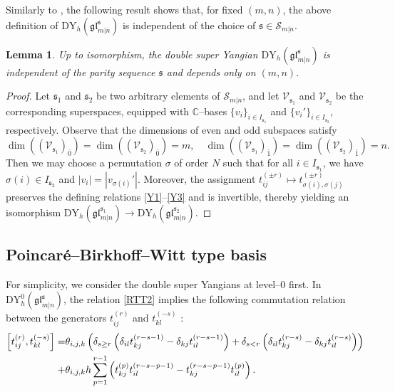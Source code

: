 \documentclass[a4paper,12pt]{article}
\newtheorem{lemm}[theo]{Lemma}
\numberwithin{equation}{section}
\begin{document}
Similarly to \cite[Lemma 2.24]{T20}, the following result shows that, for fixed $(m,n)$, the above definition of $\mathrm{DY}_{h}(\mathfrak{gl}_{m|n}^{\mathfrak{s}})$ is independent of the choice of $\mathfrak{s}\in\mathcal{S}_{m|n}$.

\begin{lemm}\label{DY-iso}
Up to isomorphism, the double super Yangian $\mathrm{DY}_{h}(\mathfrak{gl}_{m|n}^{\mathfrak{s}})$ is independent of the parity sequence $\mathfrak{s}$ and depends only on $(m,n)$.
\end{lemm}
\begin{proof}
Let $\mathfrak{s}_1$ and $\mathfrak{s}_2$ be two arbitrary elements of $\mathcal{S}_{m|n}$, and let $\mathcal{V}_{\mathfrak{s}_1}$ and $\mathcal{V}_{\mathfrak{s}_2}$ be the corresponding superspaces, equipped with $\mathbb{C}$--bases $\{v_{i}\}_{i\in I_{\mathfrak{s}_1}}$ and $\{v_{i}'\}_{i\in I_{\mathfrak{s}_2}}$, respectively. Observe that the dimensions of even and odd subspaces satisfy
$$
\dim((\mathcal{V}_{\mathfrak{s}_1})_{\bar{0}})=\dim((\mathcal{V}_{\mathfrak{s}_2})_{\bar{0}})=m,\quad \dim((\mathcal{V}_{\mathfrak{s}_1})_{\bar{1}})=\dim((\mathcal{V}_{\mathfrak{s}_2})_{\bar{1}})=n.
$$
Then we may choose a permutation $\sigma$ of order $N$ such that for all $i\in I_{\mathfrak{s}_1}$, we have $\sigma(i)\in I_{\mathfrak{s}_2}$ and $|v_i|=|v_{\sigma(i)}'|$. 
Moreover, the assignment $t_{ij}^{(\pm r)}\mapsto t_{\sigma(i),\sigma(j)}^{(\pm r)}$ preserves the defining relations \eqref{Y1}--\eqref{Y3} and is invertible, thereby yielding an isomorphism $\mathrm{DY}_{h}(\mathfrak{gl}_{m|n}^{\mathfrak{s}_1})\rightarrow \mathrm{DY}_h(\mathfrak{gl}_{m|n}^{\mathfrak{s}_2})$.
\end{proof}

\subsection{Poincar{\'e}--Birkhoff--Witt type basis}
For simplicity, we consider the double super Yangians at level--0 first.
In $\mathrm{DY}_{h}^{0}(\mathfrak{gl}^{\mathfrak{s}}_{m|n})$, the relation \eqref{RTT2} implies the following commutation relation between the generators $t_{ij}^{(r)}$ and $t_{kl}^{(-s)}$ :
\begin{align}\notag
\left[t_{ij}^{(r)},t_{kl}^{(-s)}\right]=&\theta_{i,j,k}\left(\delta_{s \geq r}\left(\delta_{il}t_{kj}^{(r-s-1)}-\delta_{kj}t_{il}^{(r-s-1)}\right)+\delta_{s < r}\left(\delta_{il}t_{kj}^{(r-s)}-\delta_{kj}t_{il}^{(r-s)}\right)\right)\\ \label{t1}
+&\theta_{i,j,k}h\sum_{p=1}^{r-1}\left(t_{kj}^{(p)}t_{il}^{(r-s-p-1)}-
t_{kj}^{(r-s-p-1)}t_{il}^{(p)}\right).
\end{align}
\end{document}
